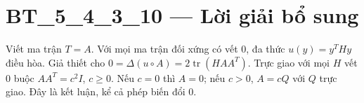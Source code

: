\documentclass[10pt,a4paper]{article}
\begin{document}
\section*{BT\_5\_4\_3\_10 — Lời giải bổ sung}
Viết ma trận $T=A$. Với mọi ma trận đối xứng có vết 0, đa thức $u(y)=y^THy$ điều hòa. Giả thiết cho $0=\Delta(u\circ A)=2\operatorname{tr}(HAA^T)$. Trực giao với mọi $H$ vết 0 buộc $AA^T=c^2I$, $c\ge0$. Nếu $c=0$ thì $A=0$; nếu $c>0$, $A=cQ$ với $Q$ trực giao. Đây là kết luận, kể cả phép biến đổi 0.
\end{document}
